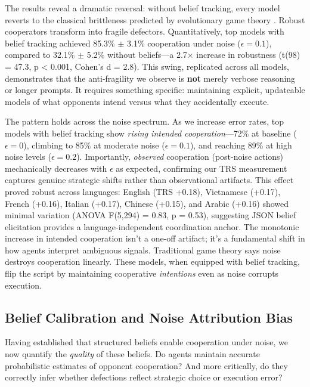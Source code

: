\documentclass{uai2026} %
\begin{document}
The results reveal a dramatic reversal: without belief tracking, every model reverts to the classical brittleness predicted by evolutionary game theory \citep{nowak1992tit}. Robust cooperators transform into fragile defectors. Quantitatively, top models with belief tracking achieved 85.3\% $\pm$ 3.1\% cooperation under noise ($\epsilon=0.1$), compared to 32.1\% $\pm$ 5.2\% without beliefs---a 2.7$\times$ increase in robustness (t(98) = 47.3, p < 0.001, Cohen's d = 2.8). This swing, replicated across all models, demonstrates that the anti-fragility we observe is \textbf{not} merely verbose reasoning or longer prompts. It requires something specific: maintaining explicit, updateable models of what opponents intend versus what they accidentally execute.

The pattern holds across the noise spectrum. As we increase error rates, top models with belief tracking show \textit{rising intended cooperation}---72\% at baseline ($\epsilon=0$), climbing to 85\% at moderate noise ($\epsilon=0.1$), and reaching 89\% at high noise levels ($\epsilon=0.2$). Importantly, \textit{observed} cooperation (post-noise actions) mechanically decreases with $\epsilon$ as expected, confirming our TRS measurement captures genuine strategic shifts rather than observational artifacts. This effect proved robust across languages: English (TRS +0.18), Vietnamese (+0.17), French (+0.16), Italian (+0.17), Chinese (+0.15), and Arabic (+0.16) showed minimal variation (ANOVA F(5,294) = 0.83, p = 0.53), suggesting JSON belief elicitation provides a language-independent coordination anchor. The monotonic increase in intended cooperation isn't a one-off artifact; it's a fundamental shift in how agents interpret ambiguous signals. Traditional game theory says noise destroys cooperation linearly. These models, when equipped with belief tracking, flip the script by maintaining cooperative \textit{intentions} even as noise corrupts execution.

\subsection{Belief Calibration and Noise Attribution Bias}

Having established that structured beliefs enable cooperation under noise, we now quantify the \textit{quality} of these beliefs. Do agents maintain accurate probabilistic estimates of opponent cooperation? And more critically, do they correctly infer whether defections reflect strategic choice or execution error?
\end{document}
